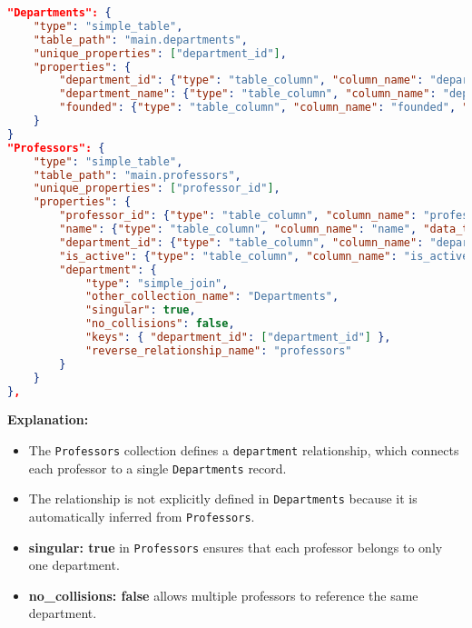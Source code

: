 \documentclass{article}
\begin{document}
\begin{lstlisting}[language=json]
"Departments": {
    "type": "simple_table",
    "table_path": "main.departments",
    "unique_properties": ["department_id"],
    "properties": {
        "department_id": {"type": "table_column", "column_name": "department_id", "data_type": "int32"},
        "department_name": {"type": "table_column", "column_name": "department_name", "data_type": "string"},
        "founded": {"type": "table_column", "column_name": "founded", "data_type": "date"},
    }
}
"Professors": {
    "type": "simple_table",
    "table_path": "main.professors",
    "unique_properties": ["professor_id"],
    "properties": {
        "professor_id": {"type": "table_column", "column_name": "professor_id", "data_type": "int32"},
        "name": {"type": "table_column", "column_name": "name", "data_type": "string"},
        "department_id": {"type": "table_column", "column_name": "department_id", "data_type": "int32"},
        "is_active": {"type": "table_column", "column_name": "is_active", "data_type": "boolean"},
        "department": {
            "type": "simple_join",
            "other_collection_name": "Departments",
            "singular": true,
            "no_collisions": false,
            "keys": { "department_id": ["department_id"] },
            "reverse_relationship_name": "professors"
        }
    }
},
\end{lstlisting}

\textbf{Explanation:}
\begin{itemize}
    \item The \texttt{Professors} collection defines a \texttt{department} relationship, which connects each professor to a single \texttt{Departments} record.
    \item The relationship is not explicitly defined in \texttt{Departments} because it is automatically inferred from \texttt{Professors}.
    \item \textbf{singular: true} in \texttt{Professors} ensures that each professor belongs to only one department.
    \item \textbf{no\_collisions: false} allows multiple professors to reference the same department.
\end{itemize}
\end{document}
